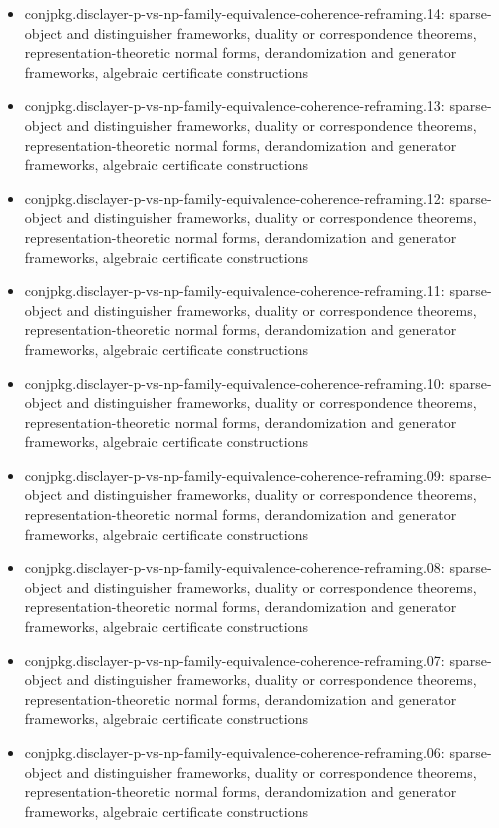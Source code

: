 \documentclass[11pt]{article}
\begin{document}
\begin{itemize}
\item conjpkg.disclayer-p-vs-np-family-equivalence-coherence-reframing.14: sparse-object and distinguisher frameworks, duality or correspondence theorems, representation-theoretic normal forms, derandomization and generator frameworks, algebraic certificate constructions
\item conjpkg.disclayer-p-vs-np-family-equivalence-coherence-reframing.13: sparse-object and distinguisher frameworks, duality or correspondence theorems, representation-theoretic normal forms, derandomization and generator frameworks, algebraic certificate constructions
\item conjpkg.disclayer-p-vs-np-family-equivalence-coherence-reframing.12: sparse-object and distinguisher frameworks, duality or correspondence theorems, representation-theoretic normal forms, derandomization and generator frameworks, algebraic certificate constructions
\item conjpkg.disclayer-p-vs-np-family-equivalence-coherence-reframing.11: sparse-object and distinguisher frameworks, duality or correspondence theorems, representation-theoretic normal forms, derandomization and generator frameworks, algebraic certificate constructions
\item conjpkg.disclayer-p-vs-np-family-equivalence-coherence-reframing.10: sparse-object and distinguisher frameworks, duality or correspondence theorems, representation-theoretic normal forms, derandomization and generator frameworks, algebraic certificate constructions
\item conjpkg.disclayer-p-vs-np-family-equivalence-coherence-reframing.09: sparse-object and distinguisher frameworks, duality or correspondence theorems, representation-theoretic normal forms, derandomization and generator frameworks, algebraic certificate constructions
\item conjpkg.disclayer-p-vs-np-family-equivalence-coherence-reframing.08: sparse-object and distinguisher frameworks, duality or correspondence theorems, representation-theoretic normal forms, derandomization and generator frameworks, algebraic certificate constructions
\item conjpkg.disclayer-p-vs-np-family-equivalence-coherence-reframing.07: sparse-object and distinguisher frameworks, duality or correspondence theorems, representation-theoretic normal forms, derandomization and generator frameworks, algebraic certificate constructions
\item conjpkg.disclayer-p-vs-np-family-equivalence-coherence-reframing.06: sparse-object and distinguisher frameworks, duality or correspondence theorems, representation-theoretic normal forms, derandomization and generator frameworks, algebraic certificate constructions

\end{itemize}
\end{document}

